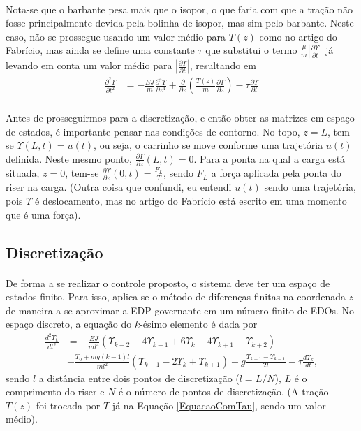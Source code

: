 \documentclass[a4paper,11pt]{scrartcl} %
\numberwithin{equation}{section} %
\numberwithin{figure}{section} %
\numberwithin{table}{section} %
\begin{document}
\paragraph{} Nota-se que o barbante pesa mais que o isopor, o que faria com que a tração não fosse principalmente devida pela bolinha de isopor, mas sim pelo barbante. Neste caso, não se prossegue usando um valor médio para $T(z)$ como no artigo do Fabrício, mas ainda se define uma constante $\tau$ que substitui o termo $\frac{\mu}{m}\left|\frac{\partial \Upsilon}{\partial t}\right|$ já levando em conta um valor médio para $\left|\frac{\partial \Upsilon}{\partial t}\right|$, resultando em \begin{align}
	\frac{\partial^2 \Upsilon}{\partial t^2} &= -\frac{EJ}{m}\frac{\partial^4 \Upsilon}{\partial z^4} + \frac{\partial}{\partial z}\left(\frac{T(z)}{m}\frac{\partial \Upsilon}{\partial z}\right) - \tau\frac{\partial \Upsilon}{\partial t}\label{EquacaoComTau}
	\end{align}
	
\paragraph{} Antes de prosseguirmos para a discretização, e então obter as matrizes em espaço de estados, é importante pensar nas condições de contorno. No topo, $z=L$, tem-se $\Upsilon(L,t)=u(t)$, ou seja, o carrinho se move conforme uma trajetória $u(t)$ definida. Neste mesmo ponto, $\frac{\partial\Upsilon}{\partial z}(L,t) = 0$. Para a ponta na qual a carga está situada, $z=0$, tem-se $\frac{\partial\Upsilon}{\partial z}(0,t) = \frac{F_L}{T}$, sendo $F_L$ a força aplicada pela ponta do riser na carga. (Outra coisa que confundi, eu entendi $u(t)$ sendo uma trajetória, pois $\Upsilon$ é deslocamento, mas no artigo do Fabrício está escrito em uma momento que é uma força).

\subsection{Discretização}
\paragraph{} De forma a se realizar o controle proposto, o sistema deve ter um espaço de estados finito. Para isso, aplica-se o método de diferenças finitas na coordenada $z$ de maneira a se aproximar a EDP governante em um número finito de EDOs. No espaço discreto, a equação do $k$-ésimo elemento é dada por \begin{align}
	\frac{d^2\Upsilon_k}{dt^2} &= -\frac{EJ}{m l^4}\left(\Upsilon_{k-2} - 4\Upsilon_{k-1}+6\Upsilon_{k}-4\Upsilon_{k+1}+\Upsilon_{k+2}\right)\nonumber\\
	&+ \frac{T_0+mg(k-1)l}{m l^2}\left(\Upsilon_{k-1}-2\Upsilon_{k} + \Upsilon_{k+1}\right)+g\frac{\Upsilon_{k+1}-\Upsilon_{k-1}}{2l}-\tau\frac{d\Upsilon_k}{dt},
\end{align} sendo $l$ a distância entre dois pontos de discretização ($l = L/N$), $L$ é o comprimento do riser e $N$ é o número de pontos de discretização. (A tração $T(z)$ foi trocada por $T$ já na Equação  \ref{EquacaoComTau}, sendo um valor médio).
\end{document}
